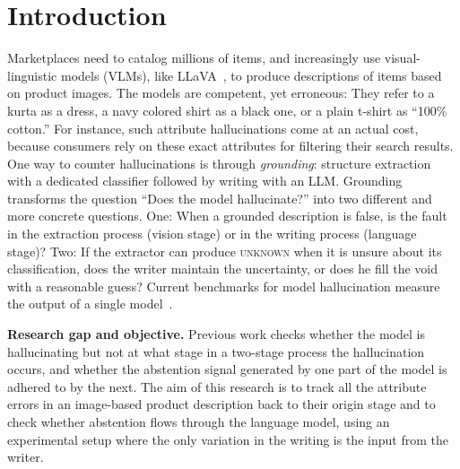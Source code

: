 \documentclass[runningheads]{llncs}
\newcommand{\unk}{\textsc{unknown}}
\begin{document}
\section{Introduction}
Marketplaces need to catalog millions of items, and increasingly use visual-linguistic models (VLMs), like LLaVA~\cite{liu2023llava,liu2024llava15}, to produce descriptions of items based on product images. The models are competent, yet erroneous: They refer to a kurta as a dress, a navy colored shirt as a black one, or a plain t-shirt as ``100\% cotton.'' For instance, such attribute hallucinations come at an actual cost, because consumers rely on these exact attributes for filtering their search results.
One way to counter hallucinations is through \emph{grounding}: structure extraction with a dedicated classifier followed by writing with an LLM. Grounding transforms the question ``Does the model hallucinate?'' into two different and more concrete questions. One: When a grounded description is false, is the fault in the extraction process (vision stage) or in the writing process (language stage)? Two: If the extractor can produce \unk{} when it is unsure about its classification, does the writer maintain the uncertainty, or does he fill the void with a reasonable guess? Current benchmarks for model hallucination measure the output of a single model~\cite{rohrbach2018chair,li2023pope}.


\noindent\textbf{Research gap and objective.} Previous work checks whether the model is hallucinating but not at what stage in a two-stage process the hallucination occurs, and whether the abstention signal generated by one part of the model is adhered to by the next. The aim of this research is to track all the attribute errors in an image-based product description back to their origin stage and to check whether abstention flows through the language model, using an experimental setup where the only variation in the writing is the input from the writer.
\end{document}
